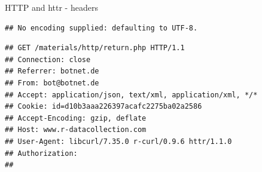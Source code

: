 \documentclass[ignorenonframetext,]{beamer}
\newenvironment{Shaded}{\begin{snugshade}}{\end{snugshade}}
\newcommand{\KeywordTok}[1]{\textcolor[rgb]{0.13,0.29,0.53}{\textbf{{#1}}}}
\newcommand{\DataTypeTok}[1]{\textcolor[rgb]{0.13,0.29,0.53}{{#1}}}
\newcommand{\StringTok}[1]{\textcolor[rgb]{0.31,0.60,0.02}{{#1}}}
\newcommand{\NormalTok}[1]{{#1}}
\begin{document}
\begin{frame}[fragile]{HTTP and httr - headers}

\begin{Shaded}
\end{Shaded}

\begin{verbatim}
## No encoding supplied: defaulting to UTF-8.
\end{verbatim}

\begin{verbatim}
## GET /materials/http/return.php HTTP/1.1
## Connection: close
## Referrer: botnet.de
## From: bot@botnet.de
## Accept: application/json, text/xml, application/xml, */*
## Cookie: id=d10b3aaa226397acafc2275ba02a2586
## Accept-Encoding: gzip, deflate
## Host: www.r-datacollection.com
## User-Agent: libcurl/7.35.0 r-curl/0.9.6 httr/1.1.0
## Authorization: 
## 
\end{verbatim}

\end{frame}
\end{document}

